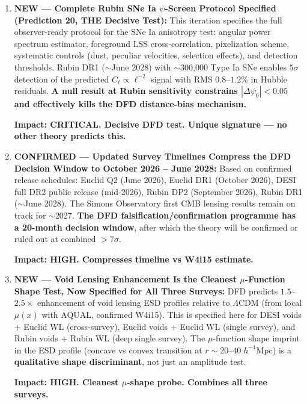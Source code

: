 \documentclass[11pt,a4paper]{article}
\newcommand{\LCDM}{$\Lambda$CDM}
\newcommand{\Dpsi}{\Delta\psi}
\begin{document}
\begin{findbox}
\begin{enumerate}
  \textbf{Impact: CRITICAL. First single-survey $> 5\sigma$ DFD test.
  Timeline: 7 months.}

\item \textbf{NEW --- Complete Rubin SNe Ia $\psi$-Screen Protocol
  Specified (Prediction 20, THE Decisive Test):}
  This iteration specifies the full observer-ready protocol for the
  SNe Ia anisotropy test: angular power spectrum estimator,
  foreground LSS cross-correlation, pixelization scheme, systematic
  controls (dust, peculiar velocities, selection effects), and
  detection thresholds. Rubin DR1 ($\sim$June 2028) with
  $\sim$300,000 Type Ia SNe enables $5\sigma$ detection of the
  predicted $C_\ell \propto \ell^{-2}$ signal with RMS $0.8$--$1.2\%$
  in Hubble residuals. \textbf{A null result at Rubin sensitivity
  constrains $|\Dpsi_0| < 0.05$ and effectively kills the DFD
  distance-bias mechanism.}

  \textbf{Impact: CRITICAL. Decisive DFD test. Unique signature ---
  no other theory predicts this.}

\item \textbf{CONFIRMED --- Updated Survey Timelines Compress the
  DFD Decision Window to October 2026 -- June 2028:}
  Based on confirmed release schedules: Euclid Q2 (June 2026),
  Euclid DR1 (October 2026), DESI full DR2 public release
  (mid-2026), Rubin DP2 (September 2026), Rubin DR1 ($\sim$June 2028).
  The Simons Observatory first CMB lensing results remain on track for
  $\sim$2027. \textbf{The DFD falsification/confirmation programme
  has a 20-month decision window}, after which the theory will be
  confirmed or ruled out at combined $> 7\sigma$.

  \textbf{Impact: HIGH. Compresses timeline vs W4i15 estimate.}

\item \textbf{NEW --- Void Lensing Enhancement Is the Cleanest
  $\mu$-Function Shape Test, Now Specified for All Three Surveys:}
  DFD predicts $1.5$--$2.5\times$ enhancement of void lensing ESD
  profiles relative to \LCDM{} (from local $\mu(x)$ with AQUAL,
  confirmed W4i15). This is specified here for DESI voids + Euclid WL
  (cross-survey), Euclid voids + Euclid WL (single survey), and Rubin
  voids + Rubin WL (deep single survey). The $\mu$-function shape
  imprint in the ESD profile (concave vs convex transition at
  $r \sim 20$--$40\;h^{-1}$Mpc) is a \textbf{qualitative shape
  discriminant}, not just an amplitude test.

  \textbf{Impact: HIGH. Cleanest $\mu$-shape probe. Combines all
  three surveys.}

\end{enumerate}
\end{findbox}
\end{document}
